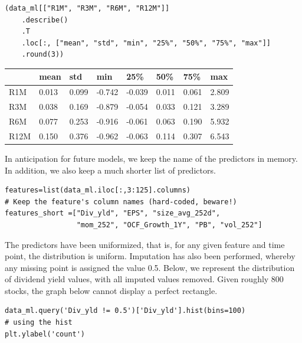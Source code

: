 \begin{verbatim}
(data_ml[["R1M", "R3M", "R6M", "R12M"]]
    .describe()
    .T
    .loc[:, ["mean", "std", "min", "25%", "50%", "75%", "max"]]
    .round(3))
\end{verbatim}

\bigskip\noindent
\begin{tabular}{p{}p{}p{}p{}p{}p{}p{}p{}}
\toprule
 & mean & std & min & 25\% & 50\% & 75\% & max \\
\hline
R1M & 0.013 & 0.099 & -0.742 & -0.039 & 0.011 & 0.061 & 2.809 \\
\hline
R3M & 0.038 & 0.169 & -0.879 & -0.054 & 0.033 & 0.121 & 3.289 \\
\hline
R6M & 0.077 & 0.253 & -0.916 & -0.061 & 0.063 & 0.190 & 5.932 \\
\hline
R12M & 0.150 & 0.376 & -0.962 & -0.063 & 0.114 & 0.307 & 6.543 \\
\hline
\bottomrule
\end{tabular}

\bigskip

In anticipation for future models, we keep the name of the predictors in memory. In addition, we also keep a much shorter list of predictors.

\begin{verbatim}
features=list(data_ml.iloc[:,3:125].columns)
# Keep the feature's column names (hard-coded, beware!)
features_short =["Div_yld", "EPS", "size_avg_252d",
                 "mom_252", "OCF_Growth_1Y", "PB", "vol_252"]
\end{verbatim}

The predictors have been uniformized, that is, for any given feature and time point, the distribution is uniform. Imputation has also been performed, whereby any missing point is assigned the value 0.5. Below, we represent the distribution of dividend yield values, with all imputed values removed. Given roughly 800 stocks, the graph below cannot display a perfect rectangle.

\begin{verbatim}
data_ml.query('Div_yld != 0.5')['Div_yld'].hist(bins=100)
# using the hist
plt.ylabel('count')
\end{verbatim}

